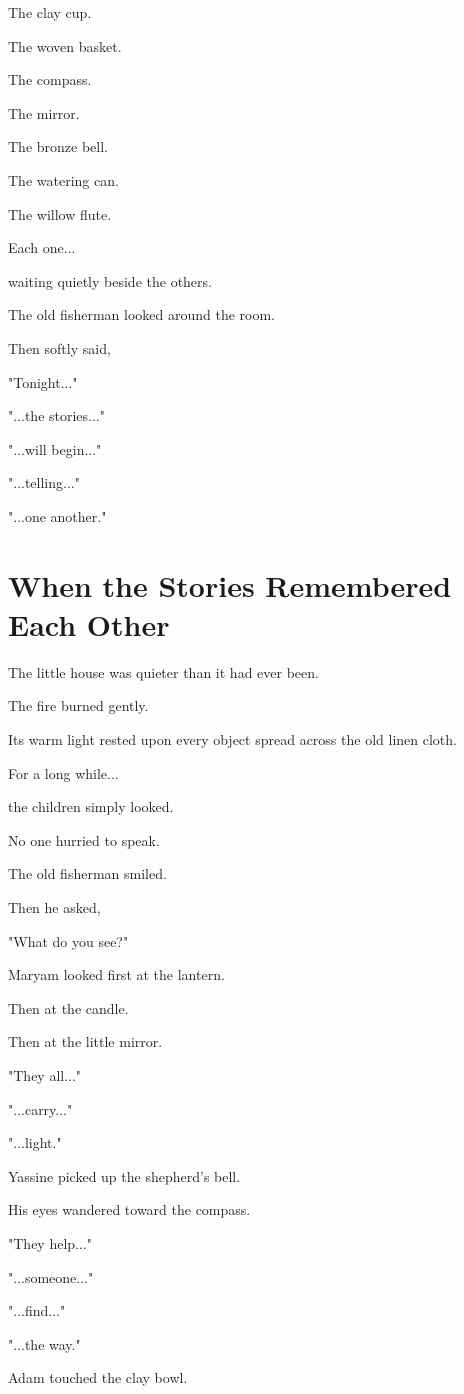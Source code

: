 \documentclass[12pt,openany]{book}
\begin{document}
The clay cup.

The woven basket.

The compass.

The mirror.

The bronze bell.

The watering can.

The willow flute.

Each one...

waiting quietly beside the others.

The old fisherman looked around the room.

Then softly said,

"Tonight..."

"...the stories..."

"...will begin..."

"...telling..."

"...one another."
\section*{When the Stories Remembered Each Other}

The little house was quieter than it had ever been.

The fire burned gently.

Its warm light rested upon every object spread across the old linen cloth.

For a long while...

the children simply looked.

No one hurried to speak.

The old fisherman smiled.

Then he asked,

"What do you see?"

Maryam looked first at the lantern.

Then at the candle.

Then at the little mirror.

"They all..."

"...carry..."

"...light."

Yassine picked up the shepherd's bell.

His eyes wandered toward the compass.

"They help..."

"...someone..."

"...find..."

"...the way."

Adam touched the clay bowl.
\end{document}
